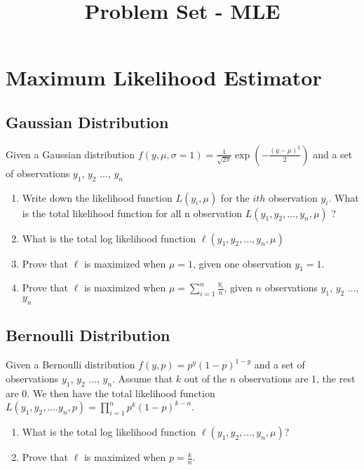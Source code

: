 \documentclass{article}
\title{Problem Set - MLE} %
\begin{document}
\maketitle %
\thispagestyle{fancy}
\pagestyle{fancy}

\section{Maximum Likelihood Estimator}
\subsection{Gaussian Distribution}

Given a Gaussian distribution $f(y,\mu, \sigma=1)=\frac{1}{\sqrt{2\pi}}\exp(-\frac{(y-\mu)^2}{2})$ and a set of observations $y_1$, $y_2$ ..., $y_n$

\begin{enumerate}
\item Write down the likelihood function $L(y_i, \mu)$ for the $ith$ observation $y_i$. What is the total likelihood function for all n observation $L(y_1, y_2, ..., y_n, \mu)$ ?
\item What is the total log likelihood function $\ell(y_1, y_2, ..., y_n, \mu)$
\item  Prove that $\ell$ is maximized when $\mu=1$, given one observation $y_1=1$.
\item  Prove that $\ell$ is maximized when $\mu=\sum\limits_{i=1}^n \frac{y_i}{n}$, given $n$ observations $y_1$, $y_2$ ..., $y_n$
\end{enumerate}

\subsection{Bernoulli Distribution}
Given a Bernoulli distribution $f(y,p)=p^y(1-p)^{1-y}$ and a set of observations $y_1$, $y_2$ ..., $y_n$. Assume that $k$ out of the $n$ observations are 1, the rest are 0. We then have the total likelihood function $L(y_1, y_2, .... y_n, p)=\prod\limits_{i=1}^n p^k (1-p)^{k-n}$.


\begin{enumerate}
\item What is the total log likelihood function $\ell(y_1, y_2, ..., y_n, \mu)$?
\item  Prove that $\ell$ is maximized when $p=\frac{k}{n}$.
\end{enumerate}
\end{document}
